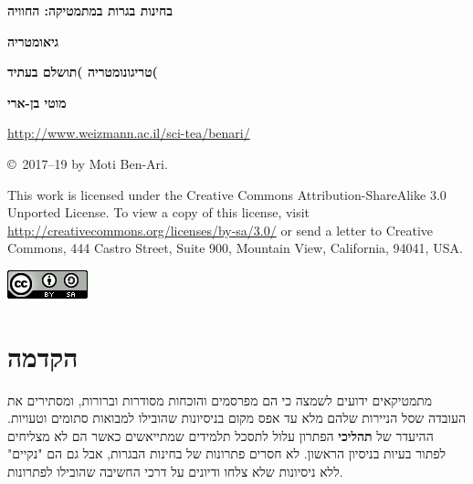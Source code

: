 
\thispagestyle{empty}

\begin{center}
\textbf{\LARGE בחינות בגרות במתמטיקה: החוויה}

\bigskip
\bigskip

\textbf{\LARGE גיאומטריה}

\bigskip

\textbf{\LARGE טריגונומטריה )תושלם בעתיד(}

\bigskip
\bigskip
\bigskip
\bigskip

\textbf{\Large מוטי בן-ארי}

\bigskip
\bigskip

\url{http://www.weizmann.ac.il/sci-tea/benari/}
\end{center}



\vfill


\begin{footnotesize}
\begin{center}
\copyright{}\ 2017--19 by Moti Ben-Ari.
\end{center}

This work is licensed under the Creative Commons Attribution-ShareAlike 3.0 Unported License. To view a copy of this license, visit \url{http://creativecommons.org/licenses/by-sa/3.0/} or send a letter to Creative Commons, 444 Castro Street, Suite 900, Mountain View, California, 94041, USA.
\end{footnotesize}

\bigskip

\begin{center}
\includegraphics[width=.15\textwidth]{../../by-sa.png}
\end{center}

\np
\thispagestyle{empty}
\mbox{}
\np
\thispagestyle{empty}

\tableofcontents
\np
\thispagestyle{empty}
\mbox{}
\np

\section*{הקדמה}

מתמטיקאים ידועים לשמצה כי הם מפרסמים והוכחות מסודרות וברורות, ומסתירים את העובדה שסל הניירות שלהם מלא עד אפס מקום בניסיונות שהובילו למבואות סתומים וטעויות. ההיעדר של 
\textbf{תהליכי}
הפתרון עלול לתסכל תלמידים שמתייאשים כאשר הם לא מצליחים לפתור בעיות בניסיון הראשון. לא חסרים פתרונות של בחינות הבגרות, אבל גם הם "נקיים" ללא ניסיונות שלא צלחו ודיונים על דרכי החשיבה שהובילו לפתרונות.


